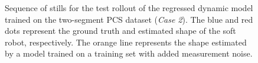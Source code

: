 \begin{figure}[ht]
    \caption{Sequence of stills for the test rollout of the regressed dynamic model trained on the two-segment \gls{PCS} dataset (\emph{Case 2}). The blue and red dots represent the ground truth and estimated shape of the soft robot, respectively. The orange line represents the shape estimated by a model trained on a training set with added measurement noise.}\label{fig:pcsregression:still_seq}
\end{figure}

